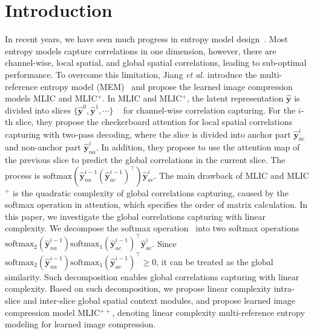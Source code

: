 \documentclass{article}
\theoremstyle{plain}
\theoremstyle{definition}
\theoremstyle{remark}
\begin{document}
  \section{Introduction}
  \label{sec:intro}
  In recent years, we have seen much progress in entropy model design~\cite{minnen2018joint,minnen2020channel,he2022elic,jiang2022mlic}.
  Most entropy models capture correlations in one dimension,
  however, there are channel-wise, local spatial, and global spatial
  correlations, leading to sub-optimal performance.
  To overcome this limitation, Jiang \textit{et al.} 
  introduce the multi-reference entropy model (MEM)~\cite{jiang2022mlic} and propose the learned 
  image compression models MLIC and MLIC$^+$. In MLIC and MLIC$^+$,
  the latent representation $\hat{\boldsymbol{y}}$ is divided into slices $\{\hat{\boldsymbol{y}}^0, \hat{\boldsymbol{y}}^1, \cdots\}$
  ~\cite{minnen2020channel} for channel-wise correlation
  capturing. For the $i$-th slice, they propose the checkerboard attention
  for local spatial correlations capturing with two-pass decoding, where the slice is divided into 
  anchor part $\hat{\boldsymbol{y}}^i_{ac}$ and non-anchor part $\hat{\boldsymbol{y}}^i_{na}$.
  In addition, they propose to use the attention map of the previous 
  slice to predict the global correlations in the current slice.
  The process is
  $\textrm{softmax}\left(\hat{\boldsymbol{y}}^{i-1}_{na}\left(\hat{\boldsymbol{y}}^{i-1}_{ac}\right)^{\top}\right)\hat{\boldsymbol{y}}^{i}_{ac}$.
  The main drawback of MLIC and MLIC$^+$ is the quadratic complexity
  of global correlations capturing, caused by the 
  softmax operation in attention, which specifies the order of matrix calculation. 
  In this paper, we investigate the global correlations capturing
  with linear complexity. We decompose the softmax operation~\cite{shen2021efficient} into two softmax operations
  $\textrm{softmax}_2\left(\hat{\boldsymbol{y}}^{i-1}_{na}\right)\textrm{softmax}_1\left(\hat{\boldsymbol{y}}^{i-1}_{ac}\right)^{\top}\hat{\boldsymbol{y}}^{i}_{ac}$.
  Since $\textrm{softmax}_2\left(\hat{\boldsymbol{y}}^{i-1}_{na}\right)\textrm{softmax}_1\left(\hat{\boldsymbol{y}}^{i-1}_{ac}\right)^{\top}\geq 0$,
  it can be treated as the global similarity.
  Such decomposition enables global correlations capturing with linear complexity.
  Based on such decomposition, we propose linear complexity
  intra-slice and inter-slice global spatial context modules, and 
  propose learned image compression model MLIC$^{++}$, denoting
  linear complexity multi-reference entropy modeling for learned image compression.
\end{document}
